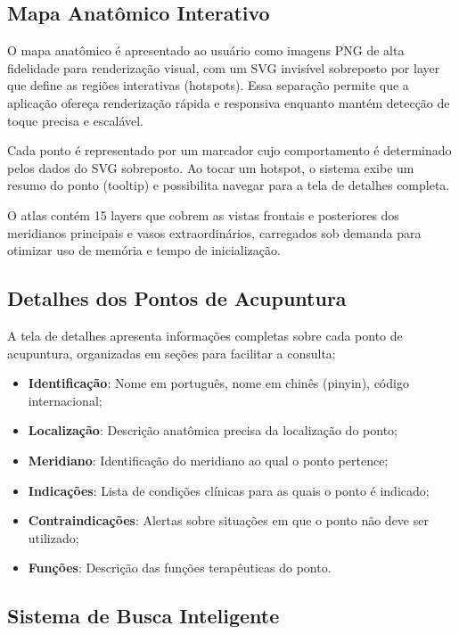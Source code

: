 \subsection{Mapa Anatômico Interativo}

O mapa anatômico é apresentado ao usuário como imagens PNG de alta fidelidade para renderização visual, com um SVG invisível sobreposto por layer que define as regiões interativas (hotspots). Essa separação permite que a aplicação ofereça renderização rápida e responsiva enquanto mantém detecção de toque precisa e escalável.

Cada ponto é representado por um marcador cujo comportamento é determinado pelos dados do SVG sobreposto. Ao tocar um hotspot, o sistema exibe um resumo do ponto (tooltip) e possibilita navegar para a tela de detalhes completa.

O atlas contém 15 layers que cobrem as vistas frontais e posteriores dos meridianos principais e vasos extraordinários, carregados sob demanda para otimizar uso de memória e tempo de inicialização.

\subsection{Detalhes dos Pontos de Acupuntura}

A tela de detalhes apresenta informações completas sobre cada ponto de acupuntura, organizadas em seções para facilitar a consulta:

\begin{itemize}
    \item \textbf{Identificação}: Nome em português, nome em chinês (pinyin), código internacional;
    \item \textbf{Localização}: Descrição anatômica precisa da localização do ponto;
    \item \textbf{Meridiano}: Identificação do meridiano ao qual o ponto pertence;
    \item \textbf{Indicações}: Lista de condições clínicas para as quais o ponto é indicado;
    \item \textbf{Contraindicações}: Alertas sobre situações em que o ponto não deve ser utilizado;
    \item \textbf{Funções}: Descrição das funções terapêuticas do ponto.
\end{itemize}

\subsection{Sistema de Busca Inteligente}

